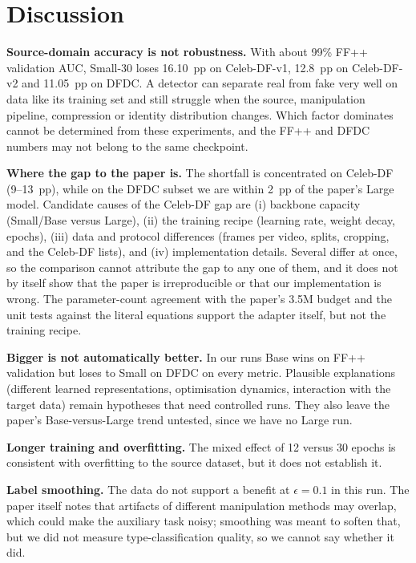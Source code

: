 \documentclass[lettersize,journal]{IEEEtran}
\begin{document}
\section{Discussion}
\textbf{Source-domain accuracy is not robustness.} With about 99\% FF++ validation AUC, Small-30 loses 16.10~pp on Celeb-DF-v1, 12.8~pp on Celeb-DF-v2 and 11.05~pp on DFDC. A detector can separate real from fake very well on data like its training set and still struggle when the source, manipulation pipeline, compression or identity distribution changes. Which factor dominates cannot be determined from these experiments, and the FF++ and DFDC numbers may not belong to the same checkpoint.

\textbf{Where the gap to the paper is.} The shortfall is concentrated on Celeb-DF (9--13~pp), while on the DFDC subset we are within 2~pp of the paper's Large model. Candidate causes of the Celeb-DF gap are (i) backbone capacity (Small/Base versus Large), (ii) the training recipe (learning rate, weight decay, epochs), (iii) data and protocol differences (frames per video, splits, cropping, and the Celeb-DF lists), and (iv) implementation details. Several differ at once, so the comparison cannot attribute the gap to any one of them, and it does not by itself show that the paper is irreproducible or that our implementation is wrong. The parameter-count agreement with the paper's 3.5M budget and the unit tests against the literal equations support the adapter itself, but not the training recipe.

\textbf{Bigger is not automatically better.} In our runs Base wins on FF++ validation but loses to Small on DFDC on every metric. Plausible explanations (different learned representations, optimisation dynamics, interaction with the target data) remain hypotheses that need controlled runs. They also leave the paper's Base-versus-Large trend untested, since we have no Large run.

\textbf{Longer training and overfitting.} The mixed effect of 12 versus 30 epochs is consistent with overfitting to the source dataset, but it does not establish it.

\textbf{Label smoothing.} The data do not support a benefit at $\epsilon=0.1$ in this run. The paper itself notes that artifacts of different manipulation methods may overlap, which could make the auxiliary task noisy; smoothing was meant to soften that, but we did not measure type-classification quality, so we cannot say whether it did.
\end{document}
